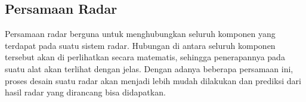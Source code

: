 \subsection{Persamaan Radar}
Persamaan radar berguna untuk menghubungkan seluruh komponen yang terdapat pada suatu sistem radar. Hubungan di antara seluruh komponen tersebut akan di perlihatkan secara matematis, sehingga penerapannya pada suatu alat akan terlihat dengan jelas. Dengan adanya beberapa persamaan ini, proses desain suatu radar akan menjadi lebih mudah dilakukan dan prediksi dari hasil radar yang dirancang bisa didapatkan.

